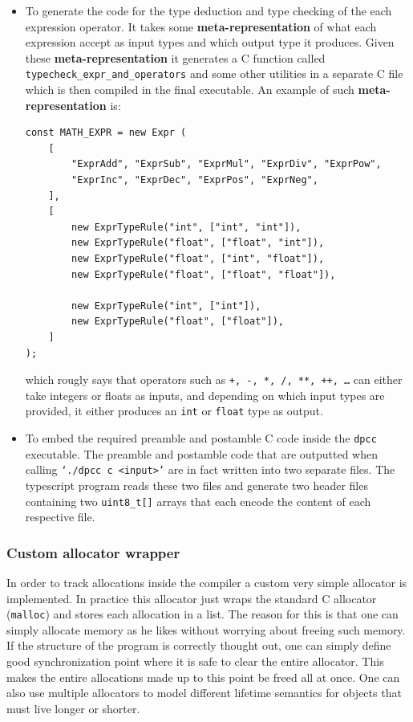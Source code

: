 \documentclass[a4paper]{article}
\begin{document}
\begin{itemize}
    \item To generate the code for the type deduction and type checking of the each expression operator. It takes
        some \textbf{meta-representation} of what each expression accept as input types and which output type it produces.
        Given these \textbf{meta-representation} it generates a C function called \texttt{typecheck\_expr\_and\_operators} and some other utilities in a separate C file which is then compiled in the final executable.
        An example of such \textbf{meta-representation} is:
        \begin{lstlisting}[language=JS]
const MATH_EXPR = new Expr (
    [
        "ExprAdd", "ExprSub", "ExprMul", "ExprDiv", "ExprPow",
        "ExprInc", "ExprDec", "ExprPos", "ExprNeg",
    ],
    [
        new ExprTypeRule("int", ["int", "int"]),
        new ExprTypeRule("float", ["float", "int"]),
        new ExprTypeRule("float", ["int", "float"]),
        new ExprTypeRule("float", ["float", "float"]),

        new ExprTypeRule("int", ["int"]),
        new ExprTypeRule("float", ["float"]),
    ]
);
        \end{lstlisting}

    which rougly says that operators such as \texttt{+, -, *, /, **, ++, \dots} can either take integers or floats as inputs,
    and depending on which input types are provided, it either produces an \texttt{int} or \texttt{float} type as output.

    \item To embed the required preamble and postamble C code inside the \texttt{dpcc} executable. The preamble and
        postamble code that are outputted when calling \texttt{`./dpcc c <input>'} are in fact written
        into two separate files. The typescript program reads these two files and generate two header files
        containing two \texttt{uint8\_t[]} arrays that each encode the content of each respective file.
\end{itemize}


\subsubsection{Custom allocator wrapper}

In order to track allocations inside the compiler a custom very simple allocator is implemented.
In practice this allocator just wraps the standard C allocator (\texttt{malloc}) and stores each allocation
in a list. The reason for this is that one can simply allocate memory as he likes without worrying about freeing
such memory. If the structure of the program is correctly thought out, one can simply define good synchronization
point where it is safe to clear the entire allocator. This makes the entire allocations made up to this point
be freed all at once. One can also use multiple allocators to model different lifetime semantics for objects
that must live longer or shorter.
\end{document}
